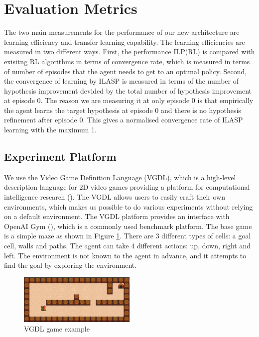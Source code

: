 \section{Evaluation Metrics}

The two main measurements for the performance of our new architecture are learning efficiency and transfer learning capability.
The learning efficiencies are measured in two different ways. First, the performance ILP(RL) is compared with exisitng RL algorithms in terms of
convergence rate, which is measured in terms of number of episodes that the agent needs to get to an optimal policy.
Second, the convergence of learning by ILASP is measured in terms of the number of hypothesis improvement devided by the total number of hypothesis improvement at episode 0.
The reason we are measuring it at only episode 0 is that empirically the agent learns the target hypothesis at episode 0 and there is no hypothesis refinement after episode 0. 
This gives a normalised convergence rate of ILASP learning with the maximum 1. 


\subsection{Experiment Platform}
We use the Video Game Definition Language (VGDL), which is a high-level description language for 2D video games providing a platform for computational intelligence research (\cite{Schaul2013}).
The VGDL allows users to easily craft their own environments, which makes us possible to do various experiments without relying on a default environment. The VGDL platform provides an interface with OpenAI Gym (\cite{Brockman2016}), which is a commonly used benchmark platform. 
The base game is a simple maze as shown in Figure \ref{VGDL_sample}.
There are 3 different types of cells: a goal cell, walls and paths. The agent can take 4 different actions: up, down, right and left.
The environment is not known to the agent in advance, and it attempts to find the goal by exploring the environment.

\begin{figure}[!ht!b]
    \centering
    \includegraphics[width=0.5\textwidth]{./figures/experiment1}
    \caption{VGDL game example}
    \label{VGDL_sample}
    \end{figure}    
